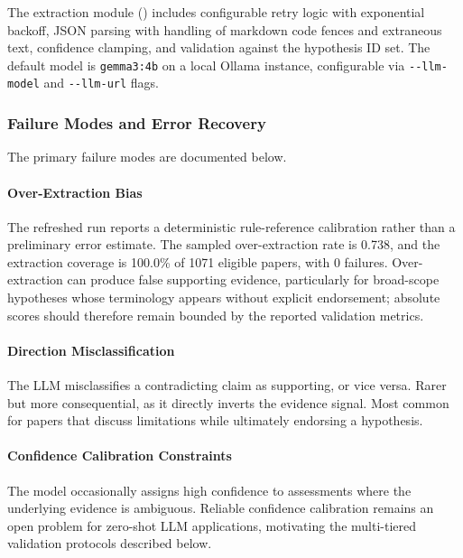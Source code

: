 \documentclass[
  english,
]{article}
\begin{document}
The extraction module ()
includes configurable retry logic with exponential backoff, JSON parsing
with handling of markdown code fences and extraneous text, confidence
clamping, and validation against the hypothesis ID set. The default
model is \texttt{gemma3:4b} on a local Ollama instance, configurable via
\texttt{-\/-llm-model} and \texttt{-\/-llm-url} flags.

\subsubsection{Failure Modes and Error
Recovery}\label{failure-modes-and-error-recovery}

The primary failure modes are documented below.

\paragraph{Over-Extraction Bias}\label{over-extraction-bias}

The refreshed run reports a deterministic rule-reference calibration
rather than a preliminary error estimate. The sampled over-extraction
rate is 0.738, and the extraction coverage is 100.0\% of 1071 eligible
papers, with 0 failures. Over-extraction can produce false supporting
evidence, particularly for broad-scope hypotheses whose terminology
appears without explicit endorsement; absolute scores should therefore
remain bounded by the reported validation metrics.

\paragraph{Direction
Misclassification}\label{direction-misclassification}

The LLM misclassifies a contradicting claim as supporting, or vice
versa. Rarer but more consequential, as it directly inverts the evidence
signal. Most common for papers that discuss limitations while ultimately
endorsing a hypothesis.

\paragraph{Confidence Calibration
Constraints}\label{confidence-calibration-constraints}

The model occasionally assigns high confidence to assessments where the
underlying evidence is ambiguous. Reliable confidence calibration
remains an open problem for zero-shot LLM applications, motivating the
multi-tiered validation protocols described below.
\end{document}
